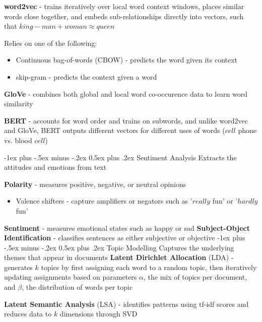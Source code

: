\documentclass[10pt,landscape]{article}
\makeatletter
\renewcommand{\subsection}{\@startsection{subsection}{2}{0mm}%
                                {-1ex plus -.5ex minus -.2ex}%
                                {0.5ex plus .2ex}%
                                {\normalfont\normalsize\bfseries}}
\makeatother
\begin{document}
\begin{multicols}{3}
    \textbf{word2vec} - trains iteratively over local  word context windows, places similar words close together, and embeds sub-relationships directly into vectors, such that $king - man + woman \approx queen$

    Relies on one of the following:
    \begin{itemize}[label={--},leftmargin=4mm]
        \itemsep -.4mm
        \item Continuous bag-of-words (CBOW) - predicts the word given its context
        \item skip-gram - predicts the context given a word
    \end{itemize}

    \textbf{GloVe} - combines both global and local word co-occurence data to learn word similarity

    \textbf{BERT} - accounts for word order and trains on subwords, and unlike word2vec and GloVe, BERT outputs different vectors for different uses of words ($cell$ phone vs. blood $cell$)

    \subsection{Sentiment Analysis}
    Extracts the attitudes and emotions from text

    \textbf{Polarity} - measures positive, negative, or neutral opinions
    \begin{itemize}[label={--},leftmargin=4mm]
        \itemsep -.4mm
        \item Valence shifters - capture amplifiers or negators such as '$really$ fun' or '$hardly$ fun'
    \end{itemize}
    \textbf{Sentiment} - measures emotional states such as happy or sad
    \textbf{Subject-Object Identification} - classifies sentences as either subjective or objective
    \subsection{Topic Modelling}
    Captures the underlying themes that appear in documents
    \textbf{Latent Dirichlet Allocation} (LDA) - generates $k$ topics by first assigning each word to a random topic, then iteratively updating assignments based on parameters $\alpha$, the mix of topics per document, and $\beta$, the distribution of words per topic

    \textbf{Latent Semantic Analysis} (LSA) - identifies patterns using tf-idf scores and reduces data to $k$ dimensions through SVD


\end{multicols}
\end{document}
